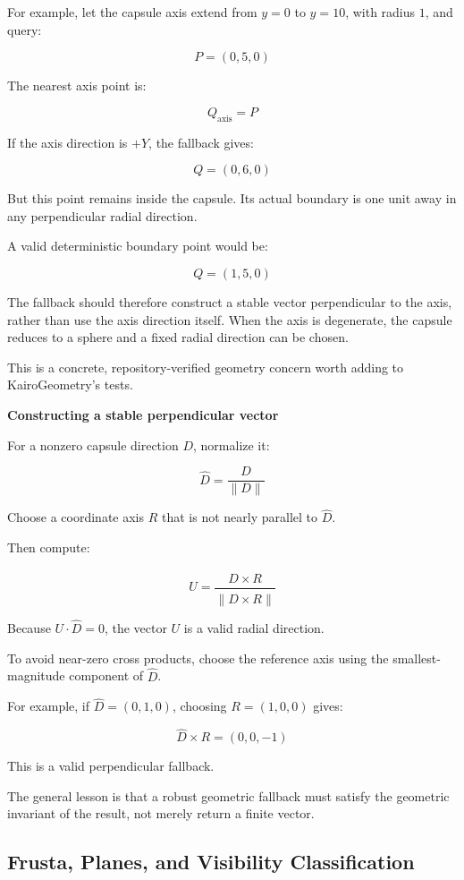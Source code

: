 For example, let the capsule axis extend from \(y=0\) to \(y=10\), with radius \(1\), and query:

\[
P=(0,5,0)
\]

The nearest axis point is:

\[
Q_{\mathrm{axis}}=P
\]

If the axis direction is \(+Y\), the fallback gives:

\[
Q=(0,6,0)
\]

But this point remains inside the capsule. Its actual boundary is one unit away in any perpendicular radial direction.

A valid deterministic boundary point would be:

\[
Q=(1,5,0)
\]

The fallback should therefore construct a stable vector perpendicular to the axis, rather than use the axis direction itself. When the axis is degenerate, the capsule reduces to a sphere and a fixed radial direction can be chosen.

This is a concrete, repository-verified geometry concern worth adding to KairoGeometry's tests.

\textbf{Constructing a stable perpendicular vector}

For a nonzero capsule direction \(D\), normalize it:

\[
\hat D=\frac{D}{\|D\|}
\]

Choose a coordinate axis \(R\) that is not nearly parallel to \(\hat D\).

Then compute:

\[
U=\frac{\hat D\times R}{\|\hat D\times R\|}
\]

Because \(U\cdot\hat D=0\), the vector \(U\) is a valid radial direction.

To avoid near-zero cross products, choose the reference axis using the smallest-magnitude component of \(\hat D\).

For example, if \(\hat D=(0,1,0)\), choosing \(R=(1,0,0)\) gives:

\[
\hat D\times R=(0,0,-1)
\]

This is a valid perpendicular fallback.

The general lesson is that a robust geometric fallback must satisfy the geometric invariant of the result, not merely return a finite vector.

\subsection{Frusta, Planes, and Visibility Classification}\label{03-visual-computing-i-ch021-frusta-planes-and-visibility-classification}

